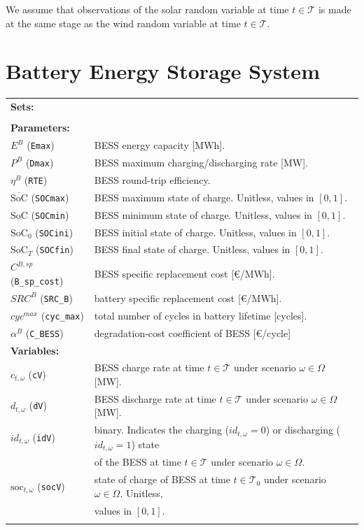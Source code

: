 \documentclass{article}
\newcommand{\SOC}{\text{SoC}}
\newcommand{\soc}{\text{soc}}
\begin{document}
We assume that observations of the solar random variable at time $t \in \mathcal{T}$ is made at the same stage as the wind random variable at time $t \in \mathcal{T}$.

\section{Battery Energy Storage System}
\label{SEC:BatteryEnergyStorageSystem}

\begin{tabularx}{\textwidth}{l l}
    \textbf{Sets:} \\
 	
    \\
    
    \textbf{Parameters:} \\
	$E^B$ (\verb|Emax|) & BESS energy capacity [MWh].	 \\
	$P^B$ (\verb|Dmax|) & BESS maximum charging/discharging rate [MW]. \\
	$\eta^B$ (\verb|RTE|) & BESS round-trip efficiency. \\
	$\overline{\SOC}$ (\verb|SOCmax|) & BESS maximum state of charge. Unitless, values in $[0, 1]$. \\
	$\underline{\SOC}$ (\verb|SOCmin|) & BESS minimum state of charge. Unitless, values in $[0, 1]$. \\
	$\SOC_0$ (\verb|SOCini|) & BESS initial state of charge. Unitless, values in $[0, 1]$. \\
	$\SOC_T$ (\verb|SOCfin|) & BESS final state of charge. Unitless, values in $[0, 1]$. \\
    $C^{B,sp}$ (\verb|B_sp_cost|) & BESS specific replacement cost [\euro/MWh]. \\
    $SRC^{B}$ (\verb|SRC_B|) & battery specific replacement cost [\euro{}/MWh]. \\
    $cyc^{max}$ (\verb|cyc_max|) & total number of cycles in battery lifetime [cycles].\\
    $\alpha^B$ (\verb|C_BESS|) & degradation-cost coefficient of BESS [\euro{}/cycle]\\
       
    \textbf{Variables:} \\
	$c_{t, \omega}$ (\verb|cV|)& BESS charge rate at time $t \in \mathcal{T}$ under scenario $\omega \in \Omega$ [MW]. \\
	$d_{t, \omega}$ (\verb|dV|)& BESS discharge rate at time $t \in \mathcal{T}$ under scenario $\omega \in \Omega$ [MW]. \\	
	$id_{t, \omega}$ (\verb|idV|) & binary. Indicates the charging ($id_{t, \omega} = 0$) or discharging ($id_{t, \omega}= 1$) state \\
	& of the BESS at time $t \in \mathcal{T}$ under scenario $\omega \in \Omega$. \\
	$\soc_{t, \omega}$ (\verb|socV|) & state of charge of BESS at time $t \in \mathcal{T}_0$ under scenario $\omega \in \Omega$. Unitless, \\
	& values in $[0, 1]$. \\
	\\
\end{tabularx}
\end{document}
